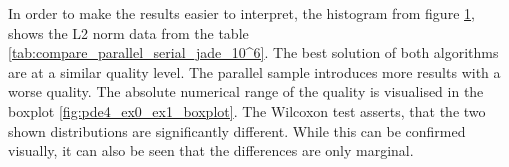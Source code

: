 \documentclass[./\jobname.tex]{subfiles}
\begin{document}
In order to make the results easier to interpret, the histogram from figure \ref{fig:pde4_ex0_ex1_histogram}, shows the L2 norm data from the table \ref{tab:compare_parallel_serial_jade_10^6}. The best solution of both algorithms are at a similar quality level. The parallel sample introduces more results with a worse quality. The absolute numerical range of the quality is visualised in the boxplot \ref{fig:pde4_ex0_ex1_boxplot}. The Wilcoxon test asserts, that the two shown distributions are significantly different. While this can be confirmed visually, it can also be seen that the differences are only marginal. 


\begin{figure}[H]
	\centering
	\noindent{}
	\label{fig:pde4_ex0_ex1_histogram}
\end{figure}
\end{document}
